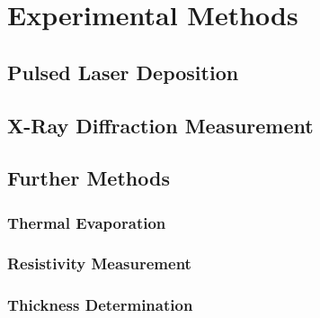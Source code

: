 \chapter{Experimental Methods}
\minitoc

\section{Pulsed Laser Deposition}
    

\section{X-Ray Diffraction Measurement}
    

\section{Further Methods}
    \subsection{Thermal Evaporation}
        
    \subsection{Resistivity Measurement}
        
            \label{Sec:Methods_vanDerPauw}
    \subsection{Thickness Determination}
        
